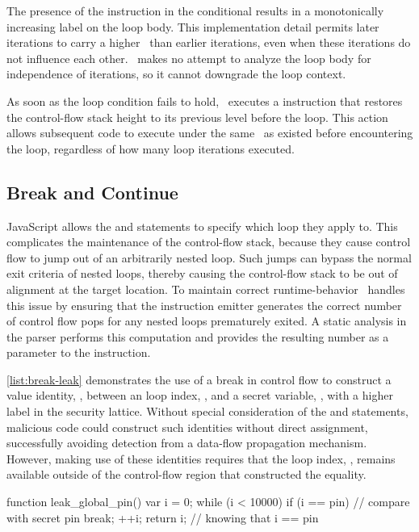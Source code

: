 The presence of the \join instruction in the conditional results in a monotonically increasing label on the loop body.
This implementation detail permits later iterations to carry a higher \pclabel\ than earlier iterations, even when these iterations do not influence each other.
\FlowCore\ makes no attempt to analyze the loop body for independence of iterations, so it cannot downgrade the loop context.

As soon as the loop condition fails to hold, \FlowCore\ executes a \popj instruction that restores the control-flow stack height to its previous level before the loop.
This action allows subsequent code to execute under the same \pclabel\ as existed before encountering the loop, regardless of how many loop iterations executed.

\subsection{Break and Continue}
\label{sec:break-and-continue}

JavaScript allows the  and  statements to specify which loop they apply to.
This complicates the maintenance of the control-flow stack, because they cause control flow to jump out of an arbitrarily nested loop.
Such jumps can bypass the normal exit criteria of nested loops, thereby causing the control-flow stack to be out of alignment at the target location.
To maintain correct runtime-behavior \FlowCore\ handles this issue by ensuring that the instruction emitter generates the correct number of control flow pops for any nested loops prematurely exited.
A static analysis in the parser performs this computation and provides the resulting number as a parameter to the \popj instruction.

\autoref{list:break-leak} demonstrates the use of a break in control flow to construct a value identity, , between an loop index, , and a secret variable, , with a higher label in the security lattice.
Without special consideration of the  and  statements, malicious code could construct such identities without direct assignment, successfully avoiding detection from a data-flow propagation mechanism.
However, making use of these identities requires that the loop index, , remains available outside of the control-flow region that constructed the equality.

\begin{jscode}
function leak_global_pin() {
  var i = 0;
  while (i < 10000) {
    if (i == pin) {   // compare with secret pin
      break;
    }
    ++i;
  }
  return i; // knowing that i == pin
}
\end{jscode}

